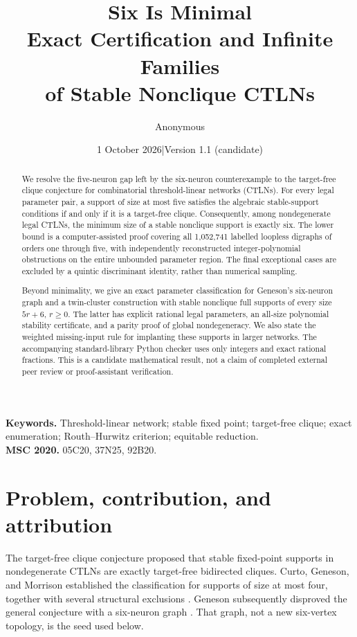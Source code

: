 \documentclass[11pt,a4paper]{article}
\title{\vspace{-12mm}\textbf{Six Is Minimal}\\[2mm]
\Large Exact Certification and Infinite Families\\of Stable Nonclique CTLNs}
\author{Anonymous}
\date{1 October 2026\quad |\quad Version 1.1 (candidate)}
\theoremstyle{definition}\newtheorem{definition}[theorem]{Definition}
\theoremstyle{remark}\newtheorem{remark}[theorem]{Remark}
\begin{document}
\maketitle
\begin{abstract}
We resolve the five-neuron gap left by the six-neuron counterexample to the target-free clique conjecture for combinatorial threshold-linear networks (CTLNs). For every legal parameter pair, a support of size at most five satisfies the algebraic stable-support conditions if and only if it is a target-free clique. Consequently, among nondegenerate legal CTLNs, the minimum size of a stable nonclique support is exactly six. The lower bound is a computer-assisted proof covering all 1,052,741 labelled loopless digraphs of orders one through five, with independently reconstructed integer-polynomial obstructions on the entire unbounded parameter region. The final exceptional cases are excluded by a quintic discriminant identity, rather than numerical sampling.

Beyond minimality, we give an exact parameter classification for Geneson's six-neuron graph and a twin-cluster construction with stable nonclique full supports of every size $5r+6$, $r\geq0$. The latter has explicit rational legal parameters, an all-size polynomial stability certificate, and a parity proof of global nondegeneracy. We also state the weighted missing-input rule for implanting these supports in larger networks. The accompanying standard-library Python checker uses only integers and exact rational fractions. This is a candidate mathematical result, not a claim of completed external peer review or proof-assistant verification.
\end{abstract}
\vspace{2mm}
\noindent\textbf{Keywords.} Threshold-linear network; stable fixed point; target-free clique; exact enumeration; Routh--Hurwitz criterion; equitable reduction.\\
\textbf{MSC 2020.} 05C20, 37N25, 92B20.

\section{Problem, contribution, and attribution}
The target-free clique conjecture proposed that stable fixed-point supports in nondegenerate CTLNs are exactly target-free bidirected cliques. Curto, Geneson, and Morrison established the classification for supports of size at most four, together with several structural exclusions \cite{CGM2024}. Geneson subsequently disproved the general conjecture with a six-neuron graph \cite{G2026}. That graph, not a new six-vertex topology, is the seed used below.
\end{document}
